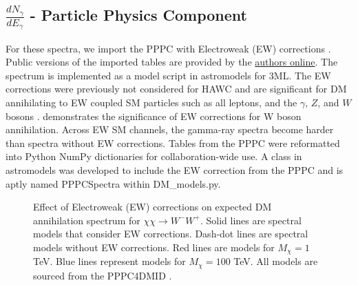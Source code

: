 \subsection{$\frac{dN_\gamma}{dE_\gamma}$ - Particle Physics Component}\label{sec:gd_particlephysics}

For these spectra, we import the PPPC with Electroweak (EW) corrections \cite{Cirelli_2011}.
Public versions of the imported tables are provided by the \href{http://www.marcocirelli.net/PPPC4DMID.html}{authors online}.
The spectrum is implemented as a model script in astromodels for 3ML.
The EW corrections were previously not considered for HAWC and are significant for DM annihilating to EW coupled SM particles such as all leptons, and the $\gamma$, $Z$, and $W$ bosons \cite{Albert_2018}.
 demonstrates the significance of EW corrections for W boson annihilation.
Across EW SM channels, the gamma-ray spectra become harder than spectra without EW corrections.
Tables from the PPPC were reformatted into Python NumPy dictionaries for collaboration-wide use.
A class in astromodels was developed to include the EW correction from the PPPC and is aptly named PPPCSpectra within DM\_models.py.

\begin{figure}[t]
\caption{Effect of Electroweak (EW) corrections on expected DM annihilation spectrum for $\chi\chi \rightarrow W^-W^+$. Solid lines are spectral models that consider EW corrections. Dash-dot lines are spectral models without EW corrections. Red lines are models for $M_\chi = 1$ TeV. Blue lines represent models for $M_\chi = 100$ TeV. All models are sourced from the PPPC4DMID \cite{Cirelli_2011}.}
\label{fig:ew_vs_noew}
\end{figure}

